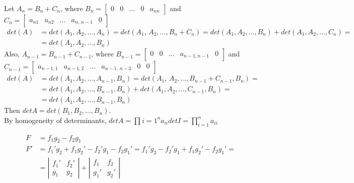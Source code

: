 \documentclass[twoside]{amsart}
\theoremstyle{plain}
\theoremstyle{definition}
\newcommand{\exercisehead}[1]
  {
   \noindent{\small\bf Exercise #1.}
   \smallskip}
\begin{document}
Let $A_n = B_n + C_n$, where $B_n = \left[ \begin{matrix} 0 & 0 & \dots & 0 & a_{nn} \end{matrix} \right]$ and $C_n = \left[ \begin{matrix} a_{n1} & a_{n2} & \dots & a_{n, \, n-1} & 0 \end{matrix} \right]$ 
\[
\begin{aligned}
  det{(A)} & = det{ (A_1, A_2, \dots, A_n) } = det{ ( A_1, \, A_2, \dots, B_n + C_n) } = det{(A_1, A_2, \dots, B_n)} + det{ (A_1, A_2, \dots, C_n) } = \\
  & = det{( A_1, A_2, \dots , B_n ) }
\end{aligned}
\]
Also, $A_{n-1} = B_{n-1} + C_{n-1}$, where $B_{n-1} = \left[ \begin{matrix} 0 & 0 & \dots & a_{n-1,n-1} & 0 \end{matrix} \right]$ and $C_{n-1} = \left[ \begin{matrix} a_{n-1,1} & a_{n-1,2} & \dots & a_{n-1, \, n-2} & 0 & 0 \end{matrix} \right]$ 
\[
\begin{aligned}
  det{(A)} & = det{ (A_1, A_2, \dots, A_{n-1}, B_n ) } = det{ ( A_1, \, A_2, \dots, B_{n-1} + C_{n-1}, B_n) } = \\ 
  & = det{(A_1, A_2, \dots, B_{n-1}, B_n)} + det{ (A_1, A_2, \dots, C_{n-1}, B_n) } = \\
  & = det{( A_1, A_2, \dots , B_{n-1}, B_n ) }
\end{aligned}
\]
Then $det{A} = det{ (B_1, B_2, \dots, B_n) }$.  \\
By homogeneity of determinants, $det{A} = \prod{i=1}^n a_{ii} det{I} = \prod_{i=1}^n a_{ii}$

\exercisehead{6} \[
\begin{aligned}
  F & = f_1 g_2 - f_2 g_1 \\
  F' & = f_1' g_2 + f_1 g_2' - f_2' g_1 - f_2 g_1' = f_1' g_2 - f_2' g_1 + f_1 g_2' - f_2 g_1' = \\
  & = \left| \begin{matrix} f_1' & f_2' \\ g_1 & g_2 \end{matrix} \right| + \left| \begin{matrix} f_1 & f_2 \\ g_1' & g_2' \end{matrix} \right|
\end{aligned}
\]
\end{document}
